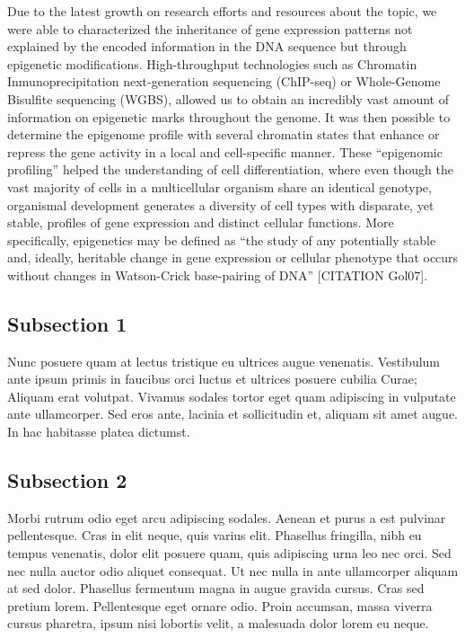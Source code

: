Due to the latest growth on research efforts and resources about the topic, we were able to characterized the inheritance of gene expression patterns not explained by the encoded information in the DNA sequence but through epigenetic modifications. High-throughput technologies such as Chromatin Inmunoprecipitation next-generation sequencing (ChIP-seq) or Whole-Genome Bisulfite sequencing (WGBS), allowed us to obtain an incredibly vast amount of information on epigenetic marks throughout the genome. It was then possible to determine the epigenome profile with several chromatin states that enhance or repress the gene activity in a local and cell-specific manner. These ``epigenomic profiling'' helped the understanding of cell differentiation, where even though the vast majority of cells in a multicellular organism share an identical genotype, organismal development generates a diversity of cell types with disparate, yet stable, profiles of gene expression and distinct cellular functions. More specifically, epigenetics may be defined as ``the study of any potentially stable and, ideally, heritable change in gene expression or cellular phenotype that occurs without changes in Watson-Crick base-pairing of DNA'' [CITATION Gol07].


\subsection{Subsection 1}

Nunc posuere quam at lectus tristique eu ultrices augue venenatis. Vestibulum ante ipsum primis in faucibus orci luctus et ultrices posuere cubilia Curae; Aliquam erat volutpat. Vivamus sodales tortor eget quam adipiscing in vulputate ante ullamcorper. Sed eros ante, lacinia et sollicitudin et, aliquam sit amet augue. In hac habitasse platea dictumst.


\subsection{Subsection 2}
Morbi rutrum odio eget arcu adipiscing sodales. Aenean et purus a est pulvinar pellentesque. Cras in elit neque, quis varius elit. Phasellus fringilla, nibh eu tempus venenatis, dolor elit posuere quam, quis adipiscing urna leo nec orci. Sed nec nulla auctor odio aliquet consequat. Ut nec nulla in ante ullamcorper aliquam at sed dolor. Phasellus fermentum magna in augue gravida cursus. Cras sed pretium lorem. Pellentesque eget ornare odio. Proin accumsan, massa viverra cursus pharetra, ipsum nisi lobortis velit, a malesuada dolor lorem eu neque.

